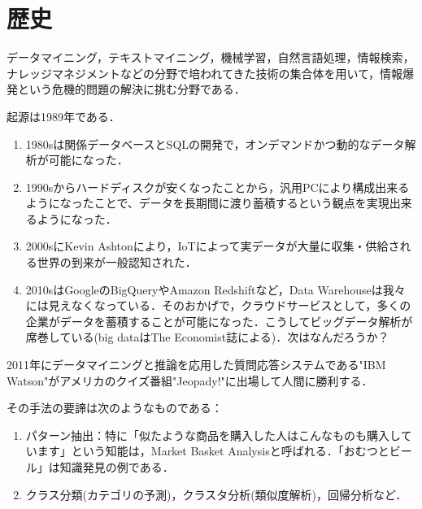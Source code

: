 \documentclass[uplatex,dvipdfmx]{jsreport}
\begin{document}
\section{歴史}

\begin{tcolorbox}[colframe=ForestGreen, colback=ForestGreen!10!white,breakable,colbacktitle=ForestGreen!40!white,coltitle=black,fonttitle=\bfseries\sffamily,
title=]
    データマイニング，テキストマイニング，機械学習，自然言語処理，情報検索，ナレッジマネジメントなどの分野で培われてきた技術の集合体を用いて，情報爆発という危機的問題の解決に挑む分野である．
\end{tcolorbox}

\begin{history}
    起源は1989年である．
    \begin{enumerate}
        \item 1980sは関係データベースとSQLの開発で，オンデマンドかつ動的なデータ解析が可能になった．
        \item 1990sからハードディスクが安くなったことから，汎用PCにより構成出来るようになったことで、データを長期間に渡り蓄積するという観点を実現出来るようになった．
        \item 2000sにKevin Ashtonにより，IoTによって実データが大量に収集・供給される世界の到来が一般認知された．
        \item 2010sはGoogleのBigQueryやAmazon Redshiftなど，Data Warehouseは我々には見えなくなっている．そのおかげで，クラウドサービスとして，多くの企業がデータを蓄積することが可能になった．こうしてビッグデータ解析が席巻している(big dataはThe Economist誌による)．次はなんだろうか？
    \end{enumerate}
    2011年にデータマイニングと推論を応用した質問応答システムである"IBM Watson"がアメリカのクイズ番組"Jeopady!"に出場して人間に勝利する．
\end{history}

\begin{remarks}
    その手法の要諦は次のようなものである：
    \begin{enumerate}
        \item パターン抽出：特に「似たような商品を購入した人はこんなものも購入しています」という知能は，Market Basket Analysisと呼ばれる．「おむつとビール」は知識発見の例である．
        \item クラス分類(カテゴリの予測)，クラスタ分析(類似度解析)，回帰分析など．
    \end{enumerate}
\end{remarks}
\end{document}
